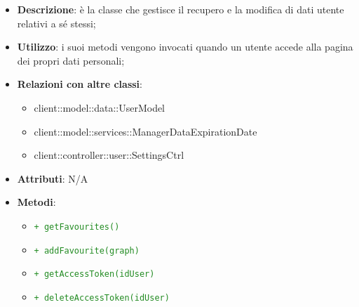 			\begin{itemize}
				\item \textbf{Descrizione}: è la classe che gestisce il recupero e la modifica di dati utente relativi a sé stessi;
				\item \textbf{Utilizzo}: i suoi metodi vengono invocati quando un utente accede alla pagina dei propri dati personali;
				\item \textbf{Relazioni con altre classi}:
					\begin{itemize}
						\item client::model::data::UserModel
						\item client::model::services::ManagerDataExpirationDate
						\item client::controller::user::SettingsCtrl
					\end{itemize}
				\item \textbf{Attributi}: N/A
				\item \textbf{Metodi}:
				\begin{itemize}
					\item \textcolor{forestgreen}{\texttt{+ getFavourites()}}
					\item \textcolor{forestgreen}{\texttt{+ addFavourite(graph)}}
					\item \textcolor{forestgreen}{\texttt{+ getAccessToken(idUser)}}
					\item \textcolor{forestgreen}{\texttt{+ deleteAccessToken(idUser)}}
					
				\end{itemize}
			\end{itemize}

